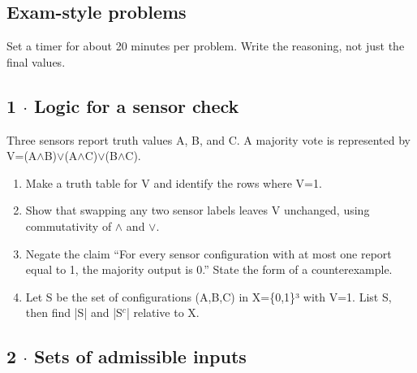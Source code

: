 \documentclass[11pt]{article}
\begin{document}
\begin{keepsection}
\end{keepsection}

\begin{keepsection}
\section{Exam-style problems}

Set a timer for about 20 minutes per problem. Write the reasoning, not just the final values.

\begin{keepsection}
\subsection{1 \ensuremath{\cdot} Logic for a sensor check}

Three sensors report truth values A, B, and C. A majority vote is represented by V=(A\ensuremath{\land}B)\ensuremath{\lor}(A\ensuremath{\land}C)\ensuremath{\lor}(B\ensuremath{\land}C).

\begin{enumerate}
\item Make a truth table for V and identify the rows where V=1.
\item Show that swapping any two sensor labels leaves V unchanged, using commutativity of \ensuremath{\land} and \ensuremath{\lor}.
\item Negate the claim “For every sensor configuration with at most one report equal to 1, the majority output is 0.” State the form of a counterexample.
\item Let S be the set of configurations (A,B,C) in X=\{0,1\}³ with V=1. List S, then find |S| and |S\ensuremath{^{c}}| relative to X.
\end{enumerate}

\end{keepsection}

\begin{keepsection}
\subsection{2 \ensuremath{\cdot} Sets of admissible inputs}


\end{keepsection}
\end{keepsection}
\end{document}
